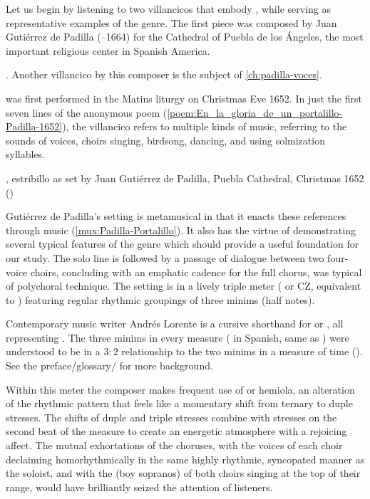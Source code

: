 Let us begin by listening to two villancicos that embody , while serving as representative examples of the genre.%
    \autocites{Murata:Singing}
    [\XXX]{Illari:Polychoral}
The first piece was composed by Juan Gutiérrez de Padilla (--1664)
for the Cathedral of Puebla de los Ángeles, the most important religious center
in Spanish America.%
\begin{Footnote}
    . 
    Another villancico by this composer is the subject of
    \cref{ch:padilla-voces}.
\end{Footnote}
 was first performed in the Matins liturgy
on Christmas Eve 1652.  
In just the first seven lines of the anonymous poem
(\cref{poem:En_la_gloria_de_un_portalillo-Padilla-1652}), the villancico refers
to multiple kinds of music, referring to the sounds of voices, choirs singing,
birdsong, dancing, and using solmization syllables.

{, estribillo as set by Juan Gutiérrez
de Padilla, Puebla Cathedral, Christmas 1652 
()}

Gutiérrez de Padilla's setting is metamusical in that it enacts these
references through music (\cref{mux:Padilla-Portalillo}).
It also has the virtue of demonstrating several typical features of the genre
which should provide a useful foundation for our study.
The solo line is followed by a passage of dialogue between two four-voice
choirs, concluding with an emphatic cadence for the full chorus, was typical of
polychoral technique.
The setting is in a lively triple meter (\meterCZ{} or CZ, equivalent to
\meterCThree) featuring regular rhythmic groupings of three minims (half
notes).
\begin{Footnote}
    Contemporary music writer Andrés Lorente \meterCZ{} is a cursive shorthand
    for \meterCThreeTwo or \meterCThree, all representing .
    The three minims in every measure ( in Spanish, same as
    ) were understood to be in a $3:2$ relationship to the two
    minims in a measure of  time ().
    \citXXX[Lorente]
    See the preface/glossary/\XXX{} for more background.
\end{Footnote}
Within this meter the composer makes frequent use of  or
hemiola, an alteration of the rhythmic pattern that feels like a momentary
shift from ternary to duple stresses.
The shifts of duple and triple stresses combine with stresses on the second
beat of the measure to create an energetic atmosphere with a rejoicing affect.  
The mutual exhortations of the choruses, with the voices of each choir declaiming
homorhythmically in the same highly rhythmic, syncopated manner as the soloist,
and with the  (boy sopranos) of both choirs singing at the top of
their range, would have brilliantly seized the attention of listeners.


